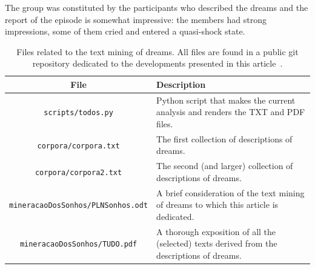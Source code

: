 \documentclass[12pt,fleqn]{article}
\begin{document}
The group was constituted by the participants who described the dreams and
the report of the episode is somewhat impressive:
the members had strong impressions, some of them cried and entered a quasi-shock state. 

\begin{table}[H] %
	\caption{Files related to the text mining of dreams.
	All files are found in a public git repository dedicated to the developments presented in this article~\citep{repo}.}\label{tab:files}
\vspace{12pt}
\centering{}
	\begin{tabular}{  c | p{8cm} }
	\textbf{File}           & \textbf{Description} \\\hline
	\texttt{scripts/todos.py}  & Python script that makes the current analysis and renders the TXT and PDF files.     \\
	\texttt{corpora/corpora.txt}  & The first collection of descriptions of dreams. \\
		\texttt{corpora/corpora2.txt}  & The second (and larger) collection of descriptions of dreams.      \\
	\texttt{mineracaoDosSonhos/PLNSonhos.odt}  & A brief consideration of the text mining of dreams to which this article is dedicated.  \\
		\texttt{mineracaoDosSonhos/TUDO.pdf}  & A thorough exposition of all the (selected) texts derived from the descriptions of dreams.  \\
\end{tabular}
\end{table}
 




\newpage %

\vspace{12cm}
\end{document}
